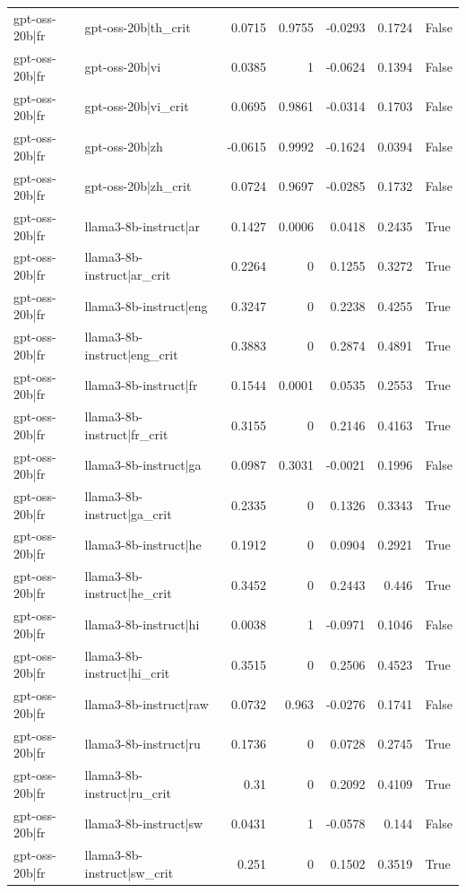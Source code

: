 \begin{table}
\begin{tabular}{l l r r r r l}
gpt-oss-20b|fr & gpt-oss-20b|th_crit & 0.0715 & 0.9755 & -0.0293 & 0.1724 & False \\
gpt-oss-20b|fr & gpt-oss-20b|vi & 0.0385 & 1 & -0.0624 & 0.1394 & False \\
gpt-oss-20b|fr & gpt-oss-20b|vi_crit & 0.0695 & 0.9861 & -0.0314 & 0.1703 & False \\
gpt-oss-20b|fr & gpt-oss-20b|zh & -0.0615 & 0.9992 & -0.1624 & 0.0394 & False \\
gpt-oss-20b|fr & gpt-oss-20b|zh_crit & 0.0724 & 0.9697 & -0.0285 & 0.1732 & False \\
gpt-oss-20b|fr & llama3-8b-instruct|ar & 0.1427 & 0.0006 & 0.0418 & 0.2435 & True \\
gpt-oss-20b|fr & llama3-8b-instruct|ar_crit & 0.2264 & 0 & 0.1255 & 0.3272 & True \\
gpt-oss-20b|fr & llama3-8b-instruct|eng & 0.3247 & 0 & 0.2238 & 0.4255 & True \\
gpt-oss-20b|fr & llama3-8b-instruct|eng_crit & 0.3883 & 0 & 0.2874 & 0.4891 & True \\
gpt-oss-20b|fr & llama3-8b-instruct|fr & 0.1544 & 0.0001 & 0.0535 & 0.2553 & True \\
gpt-oss-20b|fr & llama3-8b-instruct|fr_crit & 0.3155 & 0 & 0.2146 & 0.4163 & True \\
gpt-oss-20b|fr & llama3-8b-instruct|ga & 0.0987 & 0.3031 & -0.0021 & 0.1996 & False \\
gpt-oss-20b|fr & llama3-8b-instruct|ga_crit & 0.2335 & 0 & 0.1326 & 0.3343 & True \\
gpt-oss-20b|fr & llama3-8b-instruct|he & 0.1912 & 0 & 0.0904 & 0.2921 & True \\
gpt-oss-20b|fr & llama3-8b-instruct|he_crit & 0.3452 & 0 & 0.2443 & 0.446 & True \\
gpt-oss-20b|fr & llama3-8b-instruct|hi & 0.0038 & 1 & -0.0971 & 0.1046 & False \\
gpt-oss-20b|fr & llama3-8b-instruct|hi_crit & 0.3515 & 0 & 0.2506 & 0.4523 & True \\
gpt-oss-20b|fr & llama3-8b-instruct|raw & 0.0732 & 0.963 & -0.0276 & 0.1741 & False \\
gpt-oss-20b|fr & llama3-8b-instruct|ru & 0.1736 & 0 & 0.0728 & 0.2745 & True \\
gpt-oss-20b|fr & llama3-8b-instruct|ru_crit & 0.31 & 0 & 0.2092 & 0.4109 & True \\
gpt-oss-20b|fr & llama3-8b-instruct|sw & 0.0431 & 1 & -0.0578 & 0.144 & False \\
gpt-oss-20b|fr & llama3-8b-instruct|sw_crit & 0.251 & 0 & 0.1502 & 0.3519 & True \\

\end{tabular}
\end{table}
